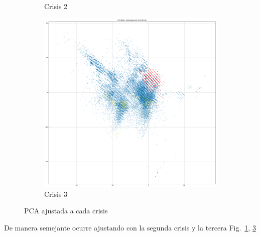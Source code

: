 \documentclass[a4paper,12pt,twoside,oldfontcommands]{memoir}
\begin{document}
\begin{figure}
\begin{subfigure}[b]{0.45\textwidth}
        \caption{Crisis 2}
        \label{fig:pca_crisis2}
    \end{subfigure}
    \begin{subfigure}[b]{0.45\textwidth}
        \includegraphics[width=\textwidth]{images/PCA-crisis3.png}
        \caption{Crisis 3}
        \label{fig:pca_crisis3}
    \end{subfigure}
    \caption{PCA ajustada a cada crisis}
\end{figure}

De manera semejante ocurre ajustando con la segunda crisis y la tercera Fig.~\ref{fig:pca_crisis2}, \ref{fig:pca_crisis3}
\end{document}
